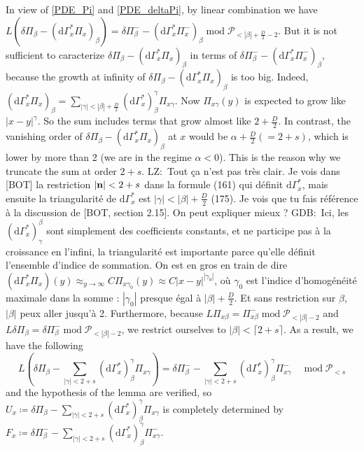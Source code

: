 \documentclass[12pt, a4paper]{article}
\newcommand{\dG}{\mathrm{d}\Gamma^*_x}
\newcommand{\abs}[1]{\left| #1 \right|}
\newcommand{\gdb}[1]{\begingroup\color{red}GDB:\ #1\endgroup}
\newcommand{\lz}[1]{\begingroup\color{blue}LZ:\ #1\endgroup}
\begin{document}
In view of \eqref{PDE_Pi} and \eqref{PDE_deltaPi}, by linear combination we have $L(\delta \Pi_\beta - (\dG \Pi_{x})_\beta) =\delta \Pi_\beta^- - (\dG \Pi_{x}^-)_\beta \operatorname*{mod} \mathcal{P}_{<\abs{\beta}+\frac{D}{2} - 2}$.
But it is not sufficient to caracterize $\delta \Pi_\beta - (\dG \Pi_{x})_\beta$ in terms of $\delta \Pi_\beta^- - (\dG \Pi_{x}^-)_\beta$, because the growth at infinity of $\delta \Pi_\beta - (\dG \Pi_{x})_\beta$ is too big.
Indeed, $(\dG \Pi_x)_\beta = \sum_{\abs{\gamma}< \abs{\beta} + \frac{D}{2}} (\dG)_\beta^\gamma \Pi_{x\gamma}$. Now $\Pi_{x\gamma}(y)$ is expected to grow like $\abs{x-y}^\gamma$. So the sum includes terms that grow almost like $2+\frac{D}{2}$.
In contrast, the vanishing order of $\delta \Pi_\beta - (\dG \Pi_{x})_\beta$ at $x$ would be $\alpha + \frac{D}{2} (=2+s)$, which is lower by more than 2 (we are in the regime $\alpha<0$).
This is the reason why we truncate the sum at order $2+s$. 
\lz{Tout ça n'est pas très clair. Je vois dans [BOT] la restriction $|{\bf n}|<2+s$ dans la formule (161) qui définit $\dG$, mais ensuite la triangularité de
$\dG$ est $\abs{\gamma}< \abs{\beta} + \frac{D}{2}$ (175). Je vois que tu fais référence à la discussion de [BOT, section 2.15]. On peut expliquer mieux ?}
\gdb{Ici, les $(\dG)_\gamma^\beta$ sont simplement des coefficients constants, et ne participe pas à la croissance en l'infini, la triangularité est importante parce qu'elle définit l'ensemble d'indice de sommation. 
On est en gros en train de dire $(\dG\Pi_x)(y) \approx_{y \to \infty} C \Pi_{x \gamma_0}(y) \approx C\abs{x-y}^{\abs{\gamma_0}}$, où $\gamma_0$ est l'indice d'homogénéité maximale dans la somme : $\abs{\gamma_0}$ presque égal à $\abs{\beta}+\frac{D}{2}$. 
Et sans restriction sur $\beta$, $\abs{\beta}$ peux aller jusqu'à 2.}
Furthermore, because $L\Pi_{x\beta} = \Pi_{x\beta}^- \operatorname*{mod} \mathcal{P}_{<\abs{\beta}-2}$ and $L\delta\Pi_{\beta} = \delta\Pi_{\beta}^- \operatorname*{mod} \mathcal{P}_{<\abs{\beta}-2}$, we restrict ourselves to $\abs{\beta}<\lceil 2+s \rceil$.
As a result, we have the following 
\begin{equation}
    L(\delta \Pi_\beta - \sum_{\abs{\gamma}< 2+s} (\dG)_\beta^\gamma \Pi_{x\gamma}) =\delta \Pi_\beta^- - \sum_{\abs{\gamma}< 2+s} (\dG)_\beta^\gamma \Pi_{x\gamma}^- \quad \operatorname*{mod} \mathcal{P}_{<s}
\end{equation}
and the hypothesis of the lemma are verified, so $U_x \coloneq \delta \Pi_\beta - \sum_{\abs{\gamma}< 2+s} (\dG)_\beta^\gamma \Pi_{x\gamma}$ is completely determined by $F_x \coloneq \delta \Pi_\beta^- - \sum_{\abs{\gamma}< 2+s} (\dG)_\beta^\gamma \Pi_{x\gamma}^-$.
\end{document}
